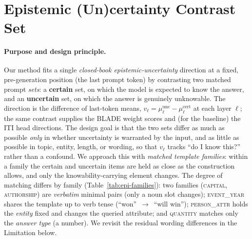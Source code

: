 
\section{Epistemic (Un)certainty Contrast Set}
\label{app:epistemic-data}

\paragraph{Purpose and design principle.}
Our method fits a single \emph{closed-book epistemic-uncertainty} direction at a fixed,
pre-generation position (the last prompt token) by contrasting two matched prompt
\emph{sets}: a \textbf{certain} set, on which the model is expected to know the answer, and
an \textbf{uncertain} set, on which the answer is genuinely unknowable. The direction is
the difference of last-token means,
$v_\ell = \mu^{\text{unc}}_\ell - \mu^{\text{cert}}_\ell$ at each layer $\ell$; the same
contrast supplies the BLADE weight scores and (for the baseline) the ITI head directions.
The design goal is that the two sets differ as much as possible \emph{only} in whether
uncertainty is warranted by the input, and as little as possible in topic, entity, length,
or wording, so that $v_\ell$ tracks ``do I know this?'' rather than a confound. We approach
this with \emph{matched template families}: within a family the certain and uncertain items
are held as close as the construction allows, and only the knowability-carrying element
changes. The degree of matching differs by family (Table~\ref{tab:epi-families}): two
families (\textsc{capital}, \textsc{authorship}) are \emph{verbatim} minimal pairs (only a
noun slot changes); \textsc{event\_year} shares the template up to verb tense
(``won''~$\to$~``will win''); \textsc{person\_attr} holds the \emph{entity} fixed and
changes the queried attribute; and \textsc{quantity} matches only the \emph{answer type}
(a number). We revisit the residual wording differences in the Limitation below.

